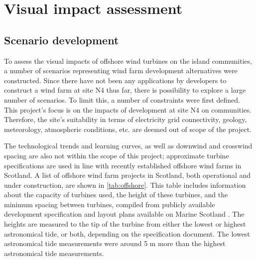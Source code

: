 \section{Visual impact assessment}

\subsection{Scenario development}

To assess the visual impacts of offshore wind turbines on the island communities, a number of scenarios representing wind farm development alternatives were constructed. Since there have not been any applications by developers to construct a wind farm at site N4 thus far, there is possibility to explore a large number of scenarios. To limit this, a number of constraints were first defined. This project's focus is on the impacts of development at site N4 on communities. Therefore, the site's suitability in terms of electricity grid connectivity, geology, meteorology, atmospheric conditions, etc. are deemed out of scope of the project.

The technological trends and learning curves, as well as downwind and crosswind spacing are also not within the scope of this project; approximate turbine specifications are used in line with recently established offshore wind farms in Scotland. A list of offshore wind farm projects in Scotland, both operational and under construction, are shown in \autoref{tab:offshore}. This table includes information about the capacity of turbines used, the height of these turbines, and the minimum spacing between turbines, compiled from publicly available development specification and layout plans available on Marine Scotland \autocite{ukgov-repd,beatrice,nng-wind,moray-east,inchcape,moray-west,seagreen}. The heights are measured to the tip of the turbine from either the lowest or highest astronomical tide, or both, depending on the specification document. The lowest astronomical tide measurements were around 5 m more than the highest astronomical tide measurements.


